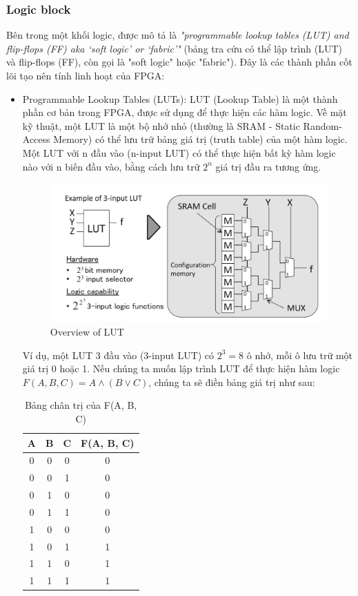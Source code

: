 \documentclass[a4paper]{article}
\begin{document}
\subsubsection{Logic block} 
Bên trong một khối logic, được mô tả là \textit{"programmable lookup tables (LUT) and flip-flops (FF) aka ‘soft logic’ or ‘fabric’"} (bảng tra cứu có thể lập trình (LUT) và flip-flops (FF), còn gọi là "soft logic" hoặc "fabric"). Đây là các thành phần cốt lõi tạo nên tính linh hoạt của FPGA:
\begin{itemize}
    \item Programmable Lookup Tables (LUTs): LUT (Lookup Table) là một thành phần cơ bản trong FPGA, được sử dụng để thực hiện các hàm logic. Về mặt kỹ thuật, một LUT là một bộ nhớ nhỏ (thường là SRAM - Static Random-Access Memory) có thể lưu trữ bảng giá trị (truth table) của một hàm logic. Một LUT với n đầu vào (n-input LUT) có thể thực hiện bất kỳ hàm logic nào với n biến đầu vào, bằng cách lưu trữ \(2^n\) giá trị đầu ra tương ứng.
    \begin{figure}[H]
        \centering
        \includegraphics[width=0.75\linewidth]{assets/lut.png}
        \caption{Overview of LUT}
        \label{fig:enter-label}
    \end{figure}
    Ví dụ, một LUT 3 đầu vào (3-input LUT) có \(2^3 = 8\) ô nhớ, mỗi ô lưu trữ một giá trị 0 hoặc 1. Nếu chúng ta muốn lập trình LUT để thực hiện hàm logic \(F(A, B, C) = A \land (B \lor C)\), chúng ta sẽ điền bảng giá trị như sau:
    
    \begin{table}[h]
        \centering
        \begin{tabular}{|c|c|c|c|}
            \hline
            A & B & C & F(A, B, C) \\
            \hline
            0 & 0 & 0 & 0 \\
            0 & 0 & 1 & 0 \\
            0 & 1 & 0 & 0 \\
            0 & 1 & 1 & 0 \\
            1 & 0 & 0 & 0 \\
            1 & 0 & 1 & 1 \\
            1 & 1 & 0 & 1 \\
            1 & 1 & 1 & 1 \\
            \hline
        \end{tabular}
        \caption{Bảng chân trị của F(A, B, C)}
        \label{tab:truth_table}
    \end{table}
    

\end{itemize}
\end{document}
